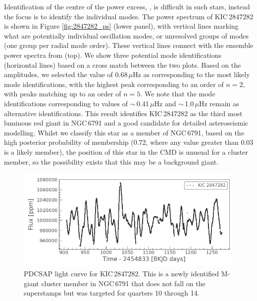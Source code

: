 Identification of the centre of the power excess, \numax{}, is difficult in such stars, instead the focus is to identify the individual modes. The power spectrum of KIC\,2847282 is shown in Figure \ref{fig:2847282_ps} (lower panel), with vertical lines marking what are potentially individual oscillation modes, or unresolved groups of modes (one group per radial mode order). These vertical lines connect with the ensemble power spectra from \cite{yu_asteroseismology_2020} (top). We show three potential mode identifications (horizontal lines) based on a cross match between the two plots. Based on the amplitudes, we selected the \numax{} value of 0.68\,$\mu$Hz as corresponding to the most likely mode identifications, with the highest peak corresponding to an order of $n = 2$, with peaks matching up to an order of $n = 5$. We note that the mode identifications corresponding to \numax{} values of $\sim$\,0.41\,$\mu$Hz and $\sim$\,1.0\,$\mu$Hz remain as alternative identifications. This result identifies KIC\,2847282 as the third most luminous red giant in NGC\,6791 and a good candidate for detailed asteroseismic modelling. Whilst we classify this star as a member of NGC\,6791, based on the high posterior probability of membership (0.72, where any value greater than 0.03 is a likely member), the position of this star in the CMD is unusual for a cluster member, so the possibility exists that this may be a background giant.

\begin{figure}
    \centering
    \includegraphics[width=\linewidth]{Chapter5/2847282_MGiant_lc.png}
    \caption[PDCSAP light curve for the new M-giant, KIC\,2847282]{PDCSAP light curve for KIC\,2847282. This is a newly identified M-giant cluster member in NGC\,6791 that does not fall on the superstamps but was targeted for quarters 10 through 14.}
    \label{fig:2847282_lc}
\end{figure}

